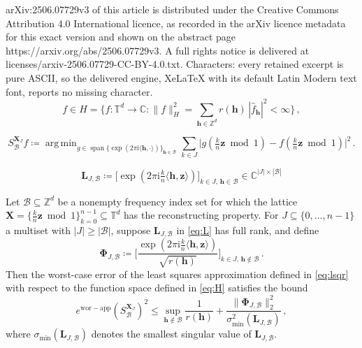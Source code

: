 \documentclass[10pt,a4paper]{amsart}
\DeclareMathOperator*{\Argmin}{arg\,min}
\DeclareMathOperator{\Span}{span}
\newcommand{\ewc}{e^{\mathrm{wor-app}}}
\newcommand{\modone}{\bmod{}1}
\renewcommand{\hat}{\widehat}
\begin{document}
arXiv:2506.07729v3 of this article is distributed under the Creative Commons Attribution 4.0 International licence, as recorded in the arXiv licence metadata for this exact version and shown on the abstract page https://arxiv.org/abs/2506.07729v3. A full rights notice is delivered at licenses/arxiv-2506.07729-CC-BY-4.0.txt. Characters: every retained excerpt is pure ASCII, so the delivered engine, XeLaTeX with its default Latin Modern text font, reports no missing character.
\begin{equation}\label{eq:H}
    f\in H
    = \Big\{ f\colon\mathds T^d \to\mathds C : 
    \|f\|_H^2
    = \sum_{\bm h\in\mathds Z^d} r(\bm h) \, |\hat f_{\bm h}|^2
    < \infty \Big\} \,,
\end{equation}

\begin{equation}\label{eq:lsqr}
    S_{\mathcal B}^{\bm X_J} f
    \coloneqq \Argmin_{g\in \Span\{\exp(2\pi\mathrm i\langle\bm h,\cdot\rangle)\}_{\bm h\in\mathcal B}} \sum_{k\in J} \Big| g(\tfrac kn\bm z\modone) - f(\tfrac kn\bm z\modone) \Big|^2 \,.
\end{equation}

    \begin{equation}\label{eq:L}
        \bm L_{J,\mathcal B}
        \coloneqq \Big[ \exp(2\pi\mathrm i\tfrac kn\langle\bm h, \bm z\rangle) \Big]_{k\in J,\, \bm h\in\mathcal B}
        \in\mathds C^{|J|\times|\mathcal B|}
    \end{equation}

\begin{theorem}\label{generalbound} Let $\mathcal B\subseteq\mathds Z^d$ be a nonempty frequency index set for which the lattice $\bm X = \{\frac kn\bm z\modone\}_{k=0}^{n-1} \subseteq\mathds T^d$ has the reconstructing property.
    For $J\subseteq\{0,\dots,n-1\}$ a multiset with $|J|\ge|\mathcal B|$, suppose $\bm L_{J,\mathcal B}$ in \eqref{eq:L} has full rank, and define
    \begin{equation}\label{eq:Phi}
        \bm\Phi_{J,\mathcal B}
        \coloneqq \Big[
        \frac{\exp(2\pi\mathrm i\frac{k}{n}\langle\bm h,\bm z\rangle)}{\sqrt{r(\bm h)}}
        \Big]_{k\in J,\,\bm h\notin\mathcal B} \,.
    \end{equation}
    Then the worst-case error of the least squares approximation defined in \eqref{eq:lsqr} with respect to the function space defined in \eqref{eq:H} satisfies the bound
    \begin{equation*}
        \ewc(S_{\mathcal B}^{\bm X_J})^2
        \le \sup_{\bm h\notin\mathcal B} \frac{1}{r(\bm h)}
        + 
        \frac{ \|\bm\Phi_{J,\mathcal B}\|_{2}^{2} }{ \sigma_{\min}^2(\bm L_{J,\mathcal B}) } \,,
    \end{equation*}
    where $\sigma_{\min}(\bm L_{J, \mathcal B})$ denotes the smallest singular value of $\bm L_{J,\mathcal B}$.
\end{theorem} 
\end{document}

